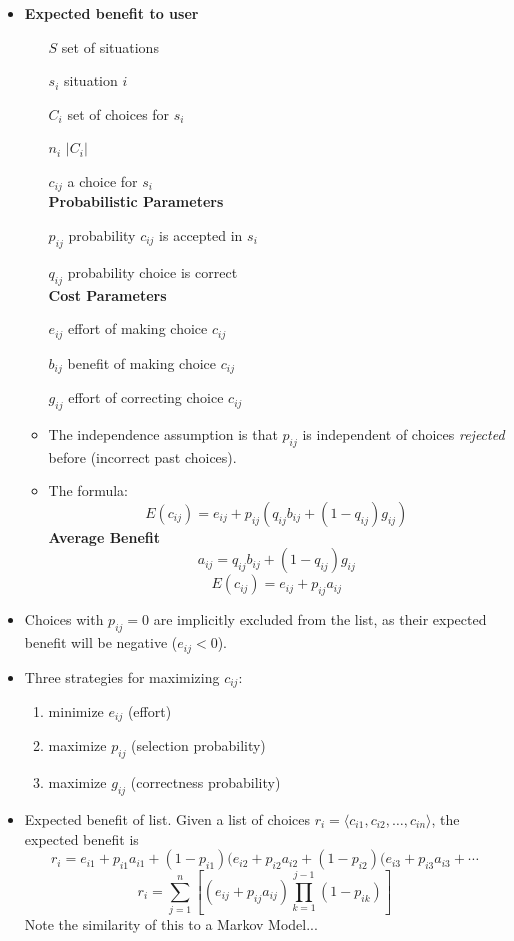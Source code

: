 \documentclass{article}
\begin{document}
\begin{itemize}
\item {\bf Expected benefit to user }
    \begin{itemize}
        {\bf Event Space}
        \item[$S$] set of situations
        \item[$s_i$] situation $i$
        \item[$C_i$] set of choices for $s_i$
        \item[$n_i$] $|C_i|$
        \item[$c_{ij}$] a choice for $s_i$ \\
        {\bf Probabilistic Parameters}
        \item[$p_{ij}$] probability $c_{ij}$ is accepted in $s_i$
        \item[$q_{ij}$] probability choice is correct \\
        {\bf Cost Parameters}
        \item[$e_{ij}$] effort of making choice $c_{ij}$
        \item[$b_{ij}$] benefit of making choice $c_{ij}$
        \item[$g_{ij}$] effort of correcting choice $c_{ij}$
        \item The independence assumption is that $p_{ij}$ is independent of choices {\it rejected} before (incorrect past choices).
        \item The formula:
    \[ E(c_{ij}) = e_{ij} + p_{ij}(q_{ij}b_{ij} + (1-q_{ij})g_{ij}) \]
        {\bf Average Benefit }
        \[ a_{ij} = q_{ij}b_{ij} + (1-q_{ij})g_{ij} \]
        \[ E(c_{ij}) = e_{ij} + p_{ij}a_{ij} \]
    \end{itemize}

\item Choices with $p_{ij} = 0$ are implicitly excluded from the list, as their expected benefit will be negative ($e_{ij} < 0$).

\item Three strategies for maximizing $c_{ij}$:
    \begin{enumerate}
        \item minimize $e_{ij}$ (effort)
        \item maximize $p_{ij}$ (selection probability)
        \item maximize $g_{ij}$ (correctness probability)
    \end{enumerate}

\item Expected benefit of list.  Given a list of choices $r_i = \langle c_{i1}, c_{i2}, \dots, c_{in} \rangle$, the expected benefit is
    \[ r_i = e_{i1} + p_{i1}a_{i1} + 
             (1-p_{i1})( e_{i2} + p_{i2}a_{i2} +
             (1-p_{i2})( e_{i3} + p_{i3}a_{i3} + \cdots \]
    \[ r_i = \sum_{j=1}^n \left[(e_{ij} + p_{ij}a_{ij})
                          \prod_{k=1}^{j-1} (1-p_{ik})\right] \]
    Note the similarity of this to a Markov Model...


\end{itemize}
\end{document}
